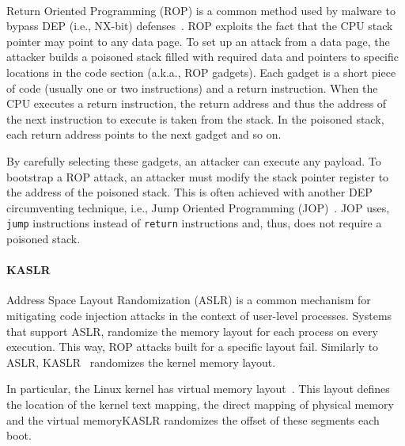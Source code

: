 \DIFaddbegin \paragraph{}

\DIFaddend Return Oriented Programming (ROP) is a common method used by malware to bypass DEP (i.e., NX-bit) defenses~\cite{RBSS12}. ROP exploits the fact that the CPU stack pointer may point to any data page. To set up an attack from a data page, the attacker builds a poisoned stack filled with required data and pointers to specific locations in the code section (a.k.a., ROP gadgets). Each gadget is a short piece of code (usually one or two instructions) and a return instruction. When the CPU executes a return instruction, the return address and thus the address of the next instruction to execute is taken from the stack. In the poisoned stack, each return address points to the next gadget and so on. 

By carefully selecting these gadgets, an attacker can execute any payload. To bootstrap a ROP attack, an attacker must modify the stack pointer register to the address of the poisoned stack. This is often achieved with another DEP circumventing technique, i.e., Jump Oriented Programming (JOP)~\cite{BJFL11}. JOP uses, \texttt{jump} instructions instead of \texttt{return} instructions and, thus, does not require a poisoned stack.

\paragraph{KASLR}\label{sec:kaslr}

Address Space Layout Randomization (ASLR) is a common mechanism for mitigating code injection attacks in the context of user-level processes. Systems that support ASLR, randomize the memory layout for each process on every execution. This way, ROP attacks built for a specific layout fail. Similarly to ASLR, KASLR~\cite{kalsr} randomizes the kernel memory layout.

In particular, the Linux kernel has \DIFdelbegin {}\DIFdelend \DIFaddbegin {}\DIFaddend virtual memory layout~\cite{mem_layout}. This layout defines the location of the kernel text mapping, the direct mapping of physical memory and the virtual memory\DIFdelbegin {}\DIFdelend \DIFaddbegin {}\DIFaddend KASLR randomizes the offset of these segments \DIFaddbegin {}\DIFaddend each boot.

